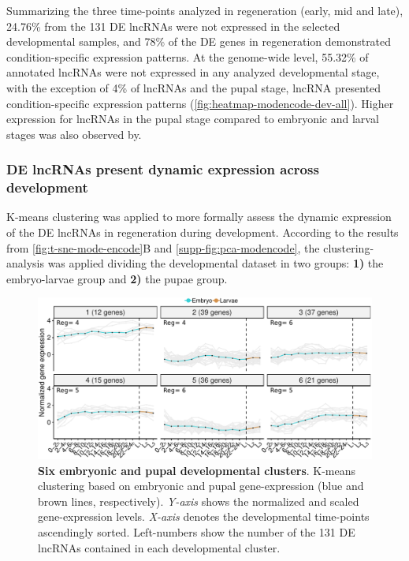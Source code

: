 Summarizing the three time-points analyzed in regeneration (early, mid and late), 24.76\% from the 131 DE lncRNAs were not expressed in the selected developmental samples, and 78\% of the DE genes in regeneration demonstrated condition-specific expression patterns. At the genome-wide level, 55.32\% of annotated lncRNAs were not expressed in any analyzed developmental stage, with the exception of 4\% of lncRNAs and the pupal stage, lncRNA presented condition-specific expression patterns (\autoref{fig:heatmap-modencode-dev-all}). Higher expression for lncRNAs in the pupal stage compared to embryonic and larval stages was also observed by.\autocite{chen_2016_lncRNA}

\subsubsection{DE lncRNAs present dynamic expression across development}
\label{paragraph:modENCODE-clusters}

K-means clustering was applied to more formally assess the dynamic expression of the DE lncRNAs in regeneration during development. According to the results from \autoref{fig:t-sne-mode-encode}B and \autoref{supp-fig:pca-modencode}, the clustering-analysis was applied dividing the developmental dataset in two groups: \textbf{1)} the embryo-larvae group and  \textbf{2)} the pupae group.

\begin{figure}[ht!]
  \centering
  \includegraphics[scale=0.6]{plots/results/dme/embryo.clusters.pdf}
  \caption[Six embryonic and pupal developmental clusters]{\textbf{Six embryonic and pupal developmental clusters}. K-means clustering based on embryonic and pupal gene-expression (blue and brown lines, respectively). \textit{Y-axis} shows the normalized and scaled gene-expression levels. \textit{X-axis} denotes the developmental time-points ascendingly sorted. Left-numbers show the number of the 131 DE lncRNAs contained in each developmental cluster.}
  \label{fig:k-means}
\end{figure}

